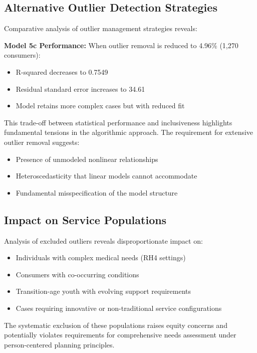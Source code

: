 \subsection{Alternative Outlier Detection Strategies}

Comparative analysis of outlier management strategies reveals:

\textbf{Model 5c Performance:} When outlier removal is reduced to 4.96\% (1,270 consumers):
\begin{itemize}
    \item R-squared decreases to 0.7549
    \item Residual standard error increases to 34.61
    \item Model retains more complex cases but with reduced fit
\end{itemize}

This trade-off between statistical performance and inclusiveness highlights fundamental tensions in the algorithmic approach. The requirement for extensive outlier removal suggests:
\begin{itemize}
    \item Presence of unmodeled nonlinear relationships
    \item Heteroscedasticity that linear models cannot accommodate
    \item Fundamental misspecification of the model structure
\end{itemize}

\subsection{Impact on Service Populations}

Analysis of excluded outliers reveals disproportionate impact on:
\begin{itemize}
    \item Individuals with complex medical needs (RH4 settings)
    \item Consumers with co-occurring conditions
    \item Transition-age youth with evolving support requirements
    \item Cases requiring innovative or non-traditional service configurations
\end{itemize}

The systematic exclusion of these populations raises equity concerns and potentially violates requirements for comprehensive needs assessment under person-centered planning principles.

